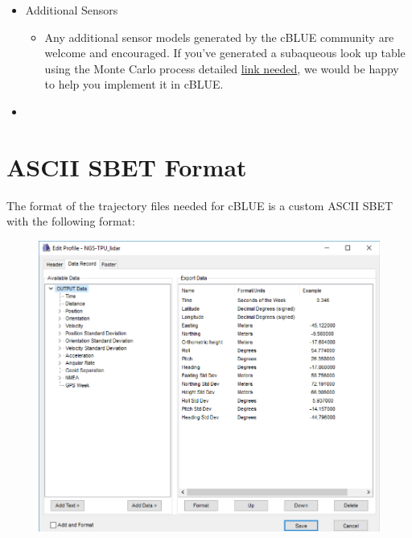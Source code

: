 \documentclass[11pt, a4paper]{article}
\begin{document}
\begin{itemize}
    \item Additional Sensors
    \begin{itemize}
        \item Any additional sensor models generated by the cBLUE community are welcome and encouraged. If you've generated a subaqueous look up table using the Monte Carlo process detailed \href{link needed}{link needed}, we would be happy to help you implement it in cBLUE. 
    \end{itemize}
    \item \ 
\end{itemize}

\appendix
\section{ASCII SBET Format}
\label{appendix:SBET}
The format of the trajectory files needed for cBLUE is a custom ASCII SBET with the following format:
\begin{figure}[H]
    \centering
    \includegraphics[width=15cm]{figs/SBET_format.png}
\end{figure}


\nocite{*}

\end{document}

